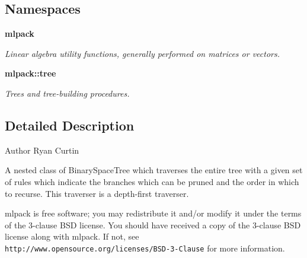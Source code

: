 \subsection*{Namespaces}
\begin{DoxyCompactItemize}
\item 
 \textbf{ mlpack}
\begin{DoxyCompactList}\small\item\em Linear algebra utility functions, generally performed on matrices or vectors. \end{DoxyCompactList}\item 
 \textbf{ mlpack\+::tree}
\begin{DoxyCompactList}\small\item\em Trees and tree-\/building procedures. \end{DoxyCompactList}\end{DoxyCompactItemize}


\subsection{Detailed Description}
\begin{DoxyAuthor}{Author}
Ryan Curtin
\end{DoxyAuthor}
A nested class of Binary\+Space\+Tree which traverses the entire tree with a given set of rules which indicate the branches which can be pruned and the order in which to recurse. This traverser is a depth-\/first traverser.

mlpack is free software; you may redistribute it and/or modify it under the terms of the 3-\/clause B\+SD license. You should have received a copy of the 3-\/clause B\+SD license along with mlpack. If not, see {\tt http\+://www.\+opensource.\+org/licenses/\+B\+S\+D-\/3-\/\+Clause} for more information. 